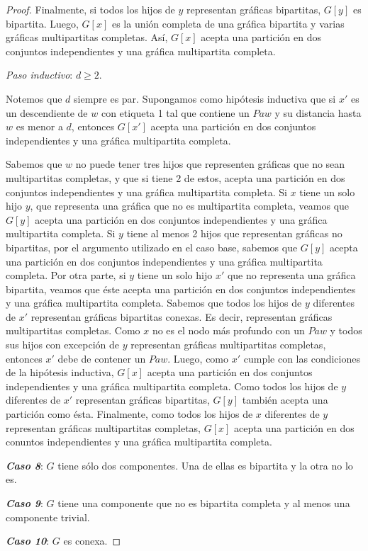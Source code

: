 \begin{proof}
Finalmente, si todos los hijos de $y$ representan gráficas bipartitas, $G[y]$ es bipartita. Luego, $G[x]$ es la unión completa de una gráfica bipartita y varias gráficas multipartitas completas. Así, $G[x]$ acepta una partición en dos conjuntos independientes y una gráfica multipartita completa. 

\emph{Paso inductivo}: $d\geq 2$.

Notemos que $d$ siempre es par. Supongamos como hipótesis inductiva que si $x'$ es un descendiente de $w$ con etiqueta 1 tal que contiene un $Paw$ y su distancia hasta $w$ es menor a $d$, entonces $G[x']$ acepta una partición en dos conjuntos independientes y una gráfica multipartita completa. 

Sabemos que $w$ no puede tener tres hijos que representen gráficas que no sean multipartitas completas, y que si tiene 2 de estos, acepta una partición en dos conjuntos independientes y una gráfica multipartita completa. Si $x$ tiene un solo hijo $y$, que representa una gráfica que no es multipartita completa, veamos que $G[y]$ acepta una partición en dos conjuntos independientes y una gráfica multipartita completa. Si $y$ tiene al menos 2 hijos que representan gráficas no bipartitas, por el argumento utilizado en el caso base, sabemos que $G[y]$ acepta una partición en dos conjuntos independientes y una gráfica multipartita completa. Por otra parte, si $y$ tiene un solo hijo $x'$ que no representa una gráfica bipartita, veamos que éste acepta una partición en dos conjuntos independientes y una gráfica multipartita completa. Sabemos que todos los hijos de $y$ diferentes de $x'$ representan gráficas bipartitas conexas. Es decir, representan gráficas multipartitas completas. Como $x$ no es el nodo más profundo con un $Paw$ y todos sus hijos con excepción de $y$ representan gráficas multipartitas completas, entonces $x'$ debe de contener un $Paw$. Luego, como $x'$ cumple con las condiciones de la hipótesis inductiva, $G[x]$ acepta una partición en dos conjuntos independientes y una gráfica multipartita completa. Como todos los hijos de $y$ diferentes de $x'$ representan gráficas bipartitas, $G[y]$ también acepta una partición como ésta. Finalmente, como todos los hijos de $x$ diferentes de $y$ representan gráficas multipartitas completas, $G[x]$ acepta una partición en dos conuntos independientes y una gráfica multipartita completa.
 
\emph{\textbf{Caso 8}}: $G$ tiene sólo dos componentes. Una de ellas es bipartita y la otra no lo es.

\emph{\textbf{Caso 9}}: $G$ tiene una componente que no es bipartita completa y al menos una componente trivial.

\emph{\textbf{Caso 10}}: $G$ es conexa.
   
\end{proof}
